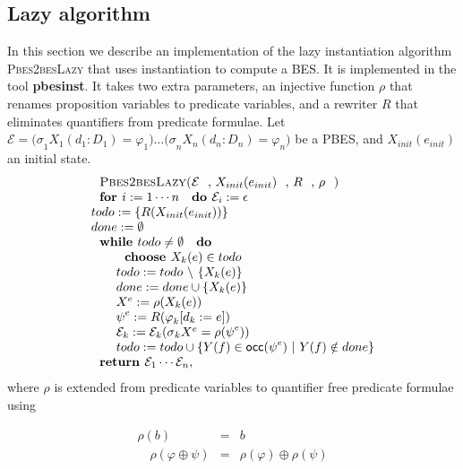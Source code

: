 \subsection{Lazy algorithm}

In this section we describe an implementation of the lazy instantiation
algorithm \textsc{Pbes2besLazy} that uses instantiation to compute a BES. It
is implemented in the tool \textbf{pbesinst}. It takes two extra parameters,
an injective function $\rho $ that renames proposition variables to
predicate variables, and a rewriter $R$ that eliminates quantifiers from
predicate formulae. Let $\mathcal{E=(\sigma }_{1}X_{1}(d_{1}:D_{1})=\varphi
_{1})\ldots \mathcal{(\sigma }_{n}X_{n}(d_{n}:D_{n})=\varphi _{n})$ be a
PBES, and $X_{init}(e_{init})$ an initial state.%
\begin{equation*}
\begin{array}{l}
\text{\textsc{Pbes2besLazy(}}\mathcal{E}\text{, }X_{init}(e_{init})\text{, }R%
\text{, }\rho \text{\textsc{)}} \\
\text{\textbf{for }}i:=1\cdots n\text{ \textbf{do }}\mathcal{E}_{i}:=\epsilon
\\
todo:=\{R(X_{init}(e_{init}))\} \\
done:=\emptyset \\
\text{\textbf{while }}todo\neq \emptyset \text{ \textbf{do}} \\
\qquad \text{\textbf{choose }}X_{k}(e)\in todo \\
\qquad todo:=todo\ \backslash \ \{X_{k}(e)\} \\
\qquad done:=done\cup \{X_{k}(e)\} \\
\qquad X^{e}:=\rho (X_{k}(e)) \\
\qquad \psi ^{e}:=R(\varphi _{k}[d_{k}:=e]) \\
\qquad \mathcal{E}_{k}:=\mathcal{E}_{k}(\mathcal{\sigma }_{k}X^{e}=\rho
(\psi ^{e})) \\
\qquad todo:=todo\cup \{Y(f)\in \mathsf{occ}(\psi ^{e})\ |\ Y(f)\notin done\}
\\
\text{\textbf{return }}\mathcal{E}_{1}\cdots \mathcal{E}_{n},%
\end{array}%
\end{equation*}%
where $\rho $ is extended from predicate variables to quantifier free
predicate formulae using

\begin{eqnarray*}
\rho (b) &=&b \\
\quad \rho (\varphi \oplus \psi ) &=&\rho (\varphi )\oplus \rho (\psi )
\end{eqnarray*}%
\newpage

